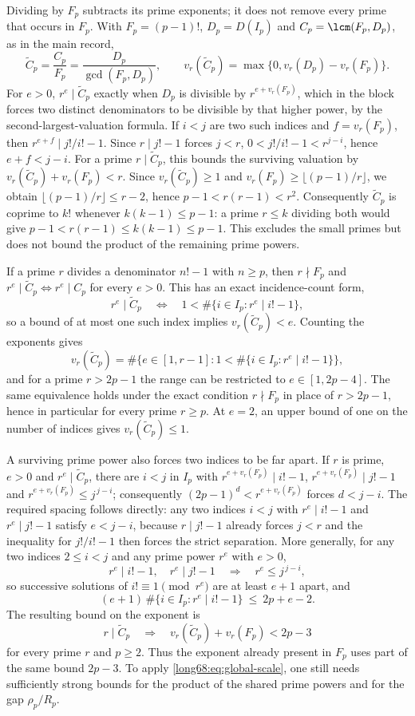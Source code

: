 Dividing by $F_p$ subtracts its prime exponents; it does not remove every
prime that occurs in $F_p$. With $F_p=(p-1)!$,
$D_p=D(I_p)$ and $C_p=\lcm(F_p,D_p)$, as in the main record,
\[
 \widetilde C_p=\frac{C_p}{F_p}=\frac{D_p}{\gcd(F_p,D_p)},\qquad
 v_r(\widetilde C_p)=\max\{0,v_r(D_p)-v_r(F_p)\} .
\]
For $e>0$, $r^e\mid\widetilde C_p$ exactly when $D_p$ is divisible by
$r^{e+v_r(F_p)}$, which in the block forces two distinct denominators to be divisible
by that higher power, by the second-largest-valuation formula. If $i<j$
are two such indices and $f=v_r(F_p)$, then
$r^{e+f}\mid j!/i!-1$. Since $r\mid j!-1$ forces $j<r$,
$0<j!/i!-1<r^{j-i}$, hence $e+f<j-i$.
For a prime $r\mid\widetilde C_p$, this bounds the surviving valuation by
$v_r(\widetilde C_p)+v_r(F_p)<r$. Since $v_r(\widetilde C_p)\ge1$ and
$v_r(F_p)\ge\lfloor(p-1)/r\rfloor$, we obtain
$\lfloor(p-1)/r\rfloor\le r-2$, hence $p-1<r(r-1)<r^2$.
Consequently $\widetilde C_p$ is coprime to $k!$ whenever
$k(k-1)\le p-1$: a prime $r\le k$ dividing both would give
$p-1<r(r-1)\le k(k-1)\le p-1$. This excludes the small primes but does not bound the
product of the remaining prime powers.

If a prime $r$ divides a denominator $n!-1$ with $n\ge p$,
then $r\nmid F_p$ and $r^e\mid\widetilde C_p\iff r^e\mid C_p$ for every
$e>0$.  This has an exact incidence-count form,
\[
 r^e\mid\widetilde C_p
 \quad\Longleftrightarrow\quad
 1<\#\{i\in I_p:r^e\mid i!-1\},
\]
so a bound of at most one such index implies $v_r(\widetilde C_p)<e$.
Counting the exponents gives
\[
 v_r(\widetilde C_p)=\#\bigl\{e\in[1,r-1]:1<\#\{i\in I_p:r^e\mid i!-1\}\bigr\},
\]
and for a prime $r>2p-1$ the range can be restricted to
$e\in[1,2p-4]$.  The same equivalence holds under the exact condition
$r\nmid F_p$ in place of $r>2p-1$, hence in particular for every prime
$r\ge p$. At $e=2$, an upper bound of one on the number of indices gives
$v_r(\widetilde C_p)\le1$.

A surviving prime power also forces two indices to be far apart.  If $r$ is prime, $e>0$ and
$r^e\mid\widetilde C_p$, there are $i<j$ in $I_p$ with
$r^{e+v_r(F_p)}\mid i!-1$, $r^{e+v_r(F_p)}\mid j!-1$ and
$r^{e+v_r(F_p)}\le j^{\,j-i}$; consequently $(2p-1)^d<r^{e+v_r(F_p)}$ forces
$d<j-i$.  The required spacing follows directly: any two indices $i<j$ with $r^e\mid i!-1$ and
$r^e\mid j!-1$ satisfy $e<j-i$, because $r\mid j!-1$ already forces $j<r$ and the
inequality for $j!/i!-1$ then forces the strict separation. More generally,
for any two indices $2\le i<j$ and any prime power $r^e$ with $e>0$,
\[
 r^e\mid i!-1,\quad r^e\mid j!-1
 \quad\Longrightarrow\quad r^e\le j^{\,j-i},
\]
so successive solutions of $i!\equiv1\pmod{r^e}$ are at least $e+1$
apart, and
\[
 (e+1)\,\#\{i\in I_p:r^e\mid i!-1\}\ \le\ 2p+e-2 .
\]
The resulting bound on the exponent is
\[
 r\mid\widetilde C_p
 \quad\Longrightarrow\quad
 v_r(\widetilde C_p)+v_r(F_p)<2p-3
\]
for every prime $r$ and $p\ge2$. Thus the exponent already present in
$F_p$ uses part of the same bound $2p-3$. To apply
\eqref{long68:eq:global-scale}, one still needs sufficiently strong bounds
for the product of the shared prime powers and for the gap $\rho_p/R_p$.

